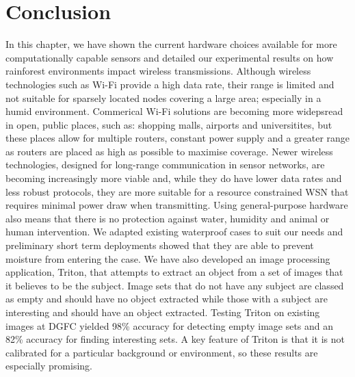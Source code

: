 \section{Conclusion}\label{tech:conc}
	In this chapter, we have shown the current hardware choices available for more computationally capable sensors and detailed our experimental results on how rainforest environments impact wireless transmissions. Although wireless technologies such as Wi-Fi provide a high data rate, their range is limited and not suitable for sparsely located nodes covering a large area; especially in a humid environment. Commerical Wi-Fi solutions are becoming more widepsread in open, public places, such as: shopping malls, airports and universitites, but these places allow for multiple routers, constant power supply and a greater range as routers are placed as high as possible to maximise coverage.
	Newer wireless technologies, designed for long-range communication in sensor networks, are becoming increasingly more viable and, while they do have lower data rates and less robust protocols, they are more suitable for a resource constrained WSN that requires minimal power draw when transmitting. 
	Using general-purpose hardware also means that there is no protection against water, humidity and animal or human intervention. We adapted existing waterproof cases to suit our needs and preliminary short term deployments showed that they are able to prevent moisture from entering the case.
	We have also developed an image processing application, Triton, that attempts to extract an object from a set of images that it believes to be the subject. Image sets that do not have any subject are classed as empty and should have no object extracted while those with a subject are interesting and should have an object extracted. Testing Triton on existing images at DGFC yielded 98\% accuracy for detecting empty image sets and an 82\% accuracy for finding interesting sets. A key feature of Triton is that it is not calibrated for a particular background or environment, so these results are especially promising.
	 
